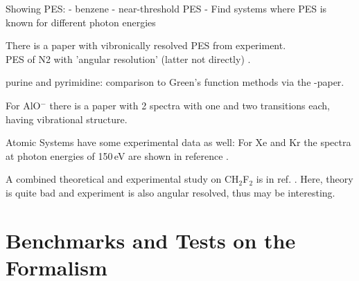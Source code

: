 Showing PES:
 - benzene
 - near-threshold PES
 - Find systems where PES is known for different photon energies

There is a paper\cite{vibPES} with vibronically resolved PES from experiment.\\
PES of N2 with 'angular resolution' (latter not directly) \cite{PESN2}.

purine and pyrimidine: comparison to Green's function methods via the \cite{PottsHolland}-paper.

For AlO$^-$ there is a paper with 2 spectra with one and two transitions each, having vibrational
structure\cite{AlO}.

Atomic Systems have some experimental data as well: For Xe and Kr the spectra at photon energies of 150$\,$eV are shown in reference \cite{KrXe}.

A combined theoretical and experimental study on CH$_2$F$_2$ is in ref. \cite{ch2f2}. Here, theory is quite bad and experiment is also angular resolved, thus may be interesting.

\section{Benchmarks and Tests on the Formalism}
\label{ch:resBench}

